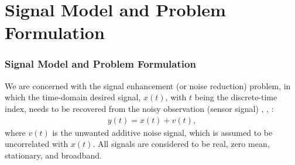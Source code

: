 \documentclass[10pt,pdflatex,headrule,landscape]{beamer}
\begin{document}
\section{Signal Model and Problem Formulation}
\begin{frame}
  \frametitle{Signal Model and Problem Formulation}
We are concerned with the signal enhancement (or noise reduction) problem, in which the time-domain desired signal, $x(t)$, with $t$ being the discrete-time index, needs to be recovered from the noisy observation (sensor signal) \cite{C2-benesty2009}, \cite{C2-vary2006}, \cite{C2-loizou2007}:
\begin{eqnarray}
\label{C2-y(t)}
 y(t) = x(t) + v(t),
\end{eqnarray}
where $v(t)$ is the unwanted additive noise signal, which is assumed to be uncorrelated with $x(t)$. All signals are considered to be real, zero mean, stationary, and broadband.

\end{frame}
\end{document}
